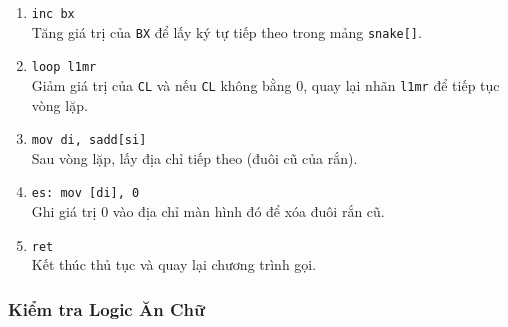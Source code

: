 \documentclass[12pt]{article}
\begin{document}
\begin{enumerate}[label=\textbf{\arabic*.}]
    \item \texttt{inc bx} \\
    Tăng giá trị của \texttt{BX} để lấy ký tự tiếp theo trong mảng \texttt{snake[]}.
    
    \item \texttt{loop l1mr} \\
    Giảm giá trị của \texttt{CL} và nếu \texttt{CL} không bằng 0, quay lại nhãn \texttt{l1mr} để tiếp tục vòng lặp.
    
    \item \texttt{mov di, sadd[si]} \\
    Sau vòng lặp, lấy địa chỉ tiếp theo (đuôi cũ của rắn).

    \item \texttt{es: mov [di], 0} \\
    Ghi giá trị 0 vào địa chỉ màn hình đó để xóa đuôi rắn cũ.

    \item \texttt{ret} \\
    Kết thúc thủ tục và quay lại chương trình gọi.
\end{enumerate}

\subsubsection*{Kiểm tra Logic Ăn Chữ}
\end{document}
